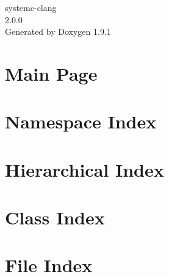 \let\mypdfximage\pdfximage\def\pdfximage{\immediate\mypdfximage}\documentclass[twoside]{book}
\newcommand{\+}{\discretionary{\mbox{\scriptsize$\hookleftarrow$}}{}{}}
\newcommand{\clearemptydoublepage}{%
  \newpage{\pagestyle{empty}\cleardoublepage}%
}
\begin{document}
\raggedbottom

\hypersetup{pageanchor=false,
             bookmarksnumbered=true,
             pdfencoding=unicode
            }
\begin{titlepage}
\vspace*{7cm}
\begin{center}%
{\Large systemc-\/clang \\[1ex]\large 2.\+0.\+0 }\\
\vspace*{1cm}
{\large Generated by Doxygen 1.9.1}\\
\end{center}
\end{titlepage}
\clearemptydoublepage
{}
\tableofcontents
\clearemptydoublepage
{}
\hypersetup{pageanchor=true}

\chapter{Main Page}
\label{index}\hypertarget{index}{}
\chapter{Namespace Index}

\chapter{Hierarchical Index}

\chapter{Class Index}

\chapter{File Index}

\end{document}
